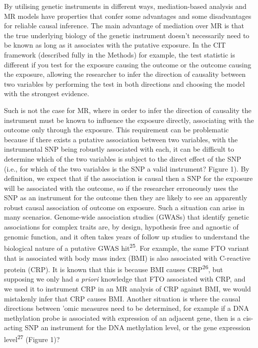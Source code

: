 \documentclass[]{article}
\begin{document}
By utilising genetic instruments in different ways, mediation-based
analysis and MR models have properties that confer some advantages and
some disadvantages for reliable causal inference. The main advantage of
mediation over MR is that the true underlying biology of the genetic
instrument doesn't necessarily need to be known as long as it associates
with the putative exposure. In the CIT framework (described fully in the
Methods) for example, the test statistic is different if you test for
the exposure causing the outcome or the outcome causing the exposure,
allowing the researcher to infer the direction of causality between two
variables by performing the test in both directions and choosing the
model with the strongest evidence.

Such is not the case for MR, where in order to infer the direction of
causality the instrument must be known to influence the exposure
directly, associating with the outcome only through the exposure. This
requirement can be problematic because if there exists a putative
association between two variables, with the instrumental SNP being
robustly associated with each, it can be difficult to determine which of
the two variables is subject to the direct effect of the SNP (i.e., for
which of the two variables is the SNP a valid instrument? Figure 1). By
definition, we expect that if the association is causal then a SNP for
the exposure will be associated with the outcome, so if the researcher
erroneously uses the SNP as an instrument for the outcome then they are
likely to see an apparently robust causal association of outcome on
exposure. Such a situation can arise in many scenarios. Genome-wide
association studies (GWASs) that identify genetic associations for
complex traits are, by design, hypothesis free and agnostic of genomic
function, and it often takes years of follow up studies to understand
the biological nature of a putative GWAS hit\textsuperscript{25}. For
example, the same FTO variant that is associated with body mass index
(BMI) is also associated with C-reactive protein (CRP). It is known that
this is because BMI causes CRP\textsuperscript{26}, but supposing we
only had \emph{a priori} knowledge that FTO associated with CRP, and we
used it to instrument CRP in an MR analysis of CRP against BMI, we would
mistakenly infer that CRP causes BMI. Another situation is where the
causal directions between 'omic measures need to be determined, for
example if a DNA methylation probe is associated with expression of an
adjacent gene, then is a cis-acting SNP an instrument for the DNA
methylation level, or the gene expression level\textsuperscript{27}
(Figure 1)?
\end{document}
